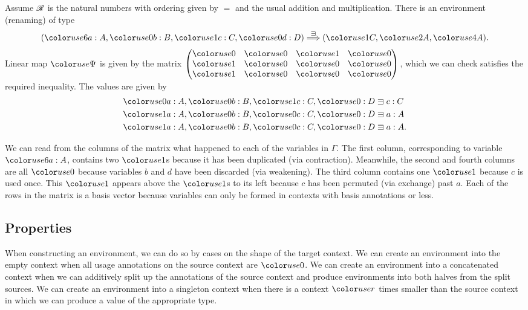 \begin{example}
  Assume $\mathscr R$ is the natural numbers with ordering given by $=$ and the usual
  addition and multiplication.
  There is an environment (renaming) of type
  \[
    \plr{\gr6a : A, \gr0b : B, \gr1c : C, \gr0d : D} \env\sqni
    \plr{\gr1C, \gr2A, \gr4A}.
  \]
  Linear map $\gr\Psi$ is given by the matrix
  \(
    \begin{pmatrix}
      \gr0 & \gr0 & \gr1 & \gr0 \\
      \gr1 & \gr0 & \gr0 & \gr0 \\
      \gr1 & \gr0 & \gr0 & \gr0
    \end{pmatrix}
  \),
  which we can check satisfies the required inequality.
  The values are given by
  \begin{align*}
    \gr0a : A, \gr0b : B, \gr1c : C, \gr0 : D &\sqni c : C \\
    \gr1a : A, \gr0b : B, \gr0c : C, \gr0 : D &\sqni a : A \\
    \gr1a : A, \gr0b : B, \gr0c : C, \gr0 : D &\sqni a : A.
  \end{align*}

  We can read from the columns of the matrix what happened to each of the
  variables in $\Gamma$.
  The first column, corresponding to variable $\gr6a : A$, contains two $\gr1$s
  because it has been duplicated (via contraction).
  Meanwhile, the second and fourth columns are all $\gr0$ because variables
  $b$ and $d$ have been discarded (via weakening).
  The third column contains one $\gr1$ because $c$ is used once.
  This $\gr1$ appears above the $\gr1$s to its left because $c$ has been
  permuted (via exchange) past $a$.
  Each of the rows in the matrix is a basis vector because variables can only
  be formed in contexts with basis annotations or less.
\end{example}

\subsection{Properties}

When constructing an environment, we can do so by cases on the shape of the
target context.
We can create an environment into the empty context when all usage annotations
on the source context are $\gr0$.
We can create an environment into a concatenated context when we can additively
split up the annotations of the source context and produce environments into
both halves from the split sources.
We can create an environment into a singleton context when there is a context
$\gr r$ times smaller than the source context in which we can produce a value
of the appropriate type.


